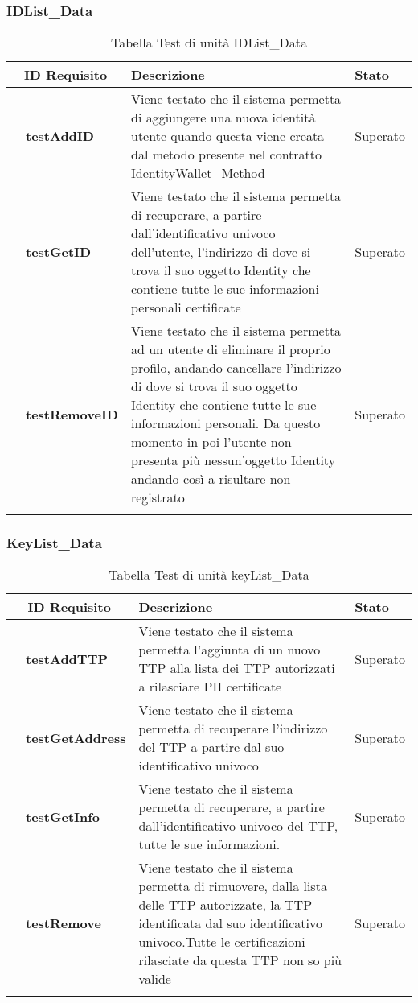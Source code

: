 \subsubsection{IDList\_Data}
\begin{longtable}{|r l|p{10cm}|p{2cm}|}
	\hline
	\multicolumn{2}{|c|}{\textbf{ID Requisito}} & \textbf{Descrizione} & \textbf{Stato}\tabularnewline
	\hline
	&\textbf{testAddID}&Viene testato che il sistema permetta di aggiungere una nuova identità utente quando questa viene creata dal metodo presente nel contratto IdentityWallet\_Method& Superato\\\hline
	&\textbf{testGetID}&Viene testato che il sistema permetta di recuperare, a partire dall'identificativo univoco dell'utente, l'indirizzo di dove si trova il suo oggetto Identity che contiene tutte le sue informazioni personali certificate& Superato\\\hline
	&\textbf{testRemoveID}&Viene testato che il sistema permetta ad un utente di eliminare il proprio profilo, andando cancellare l'indirizzo di dove si trova il suo oggetto Identity che contiene tutte le sue informazioni personali.
	Da questo momento in poi l'utente non presenta più nessun'oggetto Identity andando così a risultare non registrato
	& Superato\\\hline
	\caption{Tabella Test di unità IDList\_Data}
\end{longtable}
\subsubsection{KeyList\_Data}
\begin{longtable}{|r l|p{10cm}|p{2cm}|}
	\hline
	\multicolumn{2}{|c|}{\textbf{ID Requisito}} & \textbf{Descrizione} & \textbf{Stato}\tabularnewline
	\hline
	&\textbf{testAddTTP}&Viene testato che il sistema permetta l'aggiunta di un nuovo \gls{TTP} alla lista dei \gls{TTP} autorizzati a rilasciare \gls{PII} certificate& Superato\\\hline
	&\textbf{testGetAddress}&Viene testato che il sistema permetta di recuperare l'indirizzo del \gls{TTP} a partire dal suo identificativo univoco& Superato\\\hline
	&\textbf{testGetInfo}&Viene testato che il sistema permetta di recuperare, a partire dall'identificativo univoco del \gls{TTP}, tutte le sue informazioni.& Superato\\\hline
	&\textbf{testRemove}&Viene testato che il sistema permetta di rimuovere, dalla lista delle \gls{TTP} autorizzate, la \gls{TTP} identificata dal suo identificativo univoco.Tutte le certificazioni rilasciate da questa \gls{TTP} non so più valide& Superato\\\hline
	\caption{Tabella Test di unità keyList\_Data}
\end{longtable}
